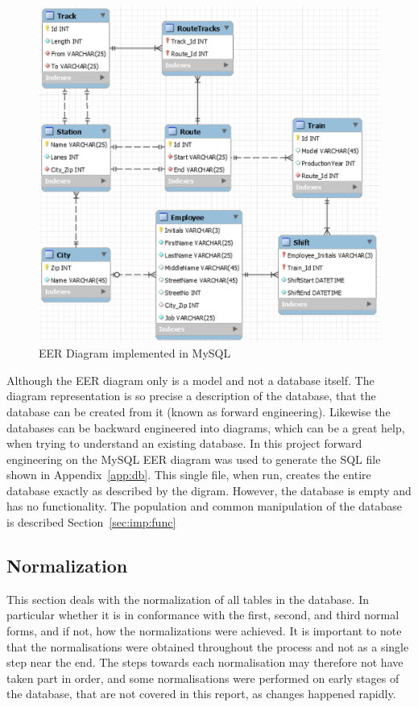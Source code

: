 \begin{figure}
    \centering
    \includegraphics{img/EER.png}
    \caption{EER Diagram implemented in MySQL}
    \label{fig:EER}
\end{figure}

Although the EER diagram only is a model and not a database itself. The diagram 
representation is so precise a description of the database, that the database 
can be created from it (known as forward engineering). Likewise the databases 
can be backward engineered into diagrams, which can be a great help, when 
trying to understand an existing database. In this project forward engineering 
on the MySQL EER diagram was used to generate the SQL file shown in 
Appendix~\ref{app:db}. This single file, when run, creates the entire database 
exactly as described by the digram. However, the database is empty and has no 
functionality. The population and common manipulation of the database is 
described Section~\ref{sec:imp:func}

\subsection{Normalization}
This section deals with the normalization of all tables in the database. In 
particular whether it is in conformance with the first, second, and third 
normal forms, and if not, how the normalizations were achieved. It is important 
to note that the normalisations were obtained throughout the process and not as 
a single step near the end. The steps towards each normalisation may therefore 
not have taken part in order, and some normalisations were performed on early 
stages of the database, that are not covered in this report, as changes 
happened rapidly. 

